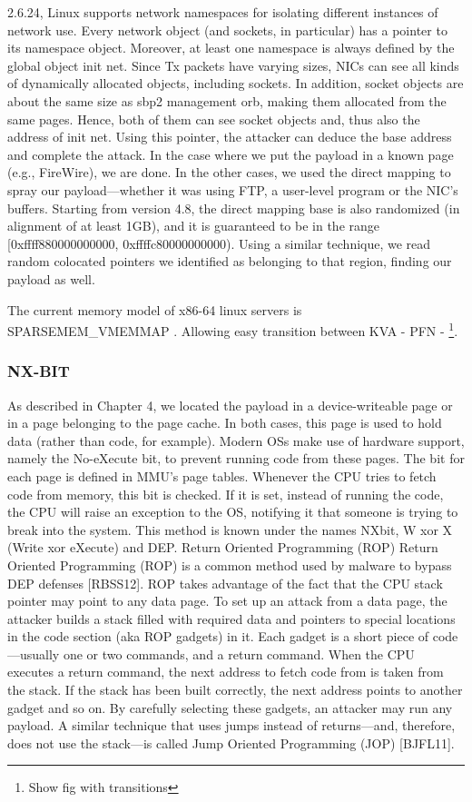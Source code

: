 2.6.24, Linux supports network namespaces for isolating different instances of network
use. Every network object (and sockets, in particular) has a pointer to its namespace
object. Moreover, at least one namespace is always defined by the global object init net.
Since Tx packets have varying sizes, NICs can see all kinds of dynamically allocated
objects, including sockets. In addition, socket objects are about the same size as
sbp2 management orb, making them allocated from the same pages. Hence, both of
them can see socket objects and, thus also the address of init net. Using this pointer,
the attacker can deduce the base address and complete the attack.
In the case where we put the payload in a known page (e.g., FireWire), we are
done. In the other cases, we used the direct mapping to spray our payload—whether it
was using FTP, a user-level program or the NIC’s buffers. Starting from version 4.8,
the direct mapping base is also randomized (in alignment of at least 1GB), and it is
guaranteed to be in the range [0xffff880000000000, 0xffffc80000000000). Using a similar
technique, we read random colocated pointers we identified as belonging to that region,
finding our payload as well.

The current memory model of x86-64 linux servers is SPARSEMEM\_VMEMMAP \cite{mem_model}. Allowing easy transition between KVA - PFN - \page\footnote{Show fig with transitions}.
\subsubsection{NX-BIT}
As described in Chapter 4, we located the payload in a device-writeable page or in
a page belonging to the page cache. In both cases, this page is used to hold data
(rather than code, for example). Modern OSs make use of hardware support, namely
the No-eXecute bit, to prevent running code from these pages. The bit for each page is
defined in MMU’s page tables. Whenever the CPU tries to fetch code from memory, this
bit is checked. If it is set, instead of running the code, the CPU will raise an exception to the OS, notifying it that someone is trying to break into the system. This method is known under the names NX\-bit, W xor X (Write xor eXecute) and DEP.
Return Oriented Programming (ROP) Return Oriented Programming (ROP)
is a common method used by malware to bypass DEP defenses [RBSS12]. ROP takes
advantage of the fact that the CPU stack pointer may point to any data page. To set
up an attack from a data page, the attacker builds a stack filled with required data and
pointers to special locations in the code section (aka ROP gadgets) in it. Each gadget is
a short piece of code—usually one or two commands, and a return command. When the
CPU executes a return command, the next address to fetch code from is taken from the
stack. If the stack has been built correctly, the next address points to another gadget
and so on. By carefully selecting these gadgets, an attacker may run any payload. A
similar technique that uses jumps instead of returns—and, therefore, does not use the
stack—is called Jump Oriented Programming (JOP) [BJFL11].
